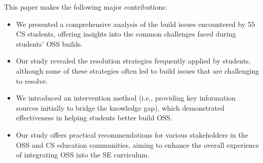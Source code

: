 This paper makes the following major contributions:
\begin{itemize}[leftmargin=*]
    \item We presented a comprehensive analysis of the build issues encountered by 55 CS students, offering insights into the common challenges faced during students' OSS builds.

    \item Our study revealed the resolution strategies frequently applied by students, although some of these strategies often led to build issues that are challenging to resolve.

    \item We introduced an intervention method (i.e., providing key information sources initially to bridge the knowledge gap), which demonstrated effectiveness in helping students better build OSS.

   \item Our study offers practical recommendations for various stakeholders in the OSS and CS education communities, aiming to enhance the overall experience of integrating OSS into the SE curriculum.
\end{itemize}